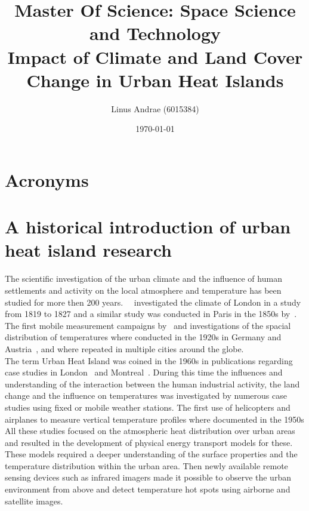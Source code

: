 \documentclass[a4paper, english]{article}
\title{\vspace{1cm}Master Of Science: Space Science and Technology\\ \vspace{1cm} \textbf{\huge Impact of Climate and Land Cover Change in Urban Heat Islands}\\ \vspace{1.2cm} }
\author{Linus Andrae (6015384)}
\date{\today}
\begin{document}
  
  \newpage

  
  \newpage

  \tableofcontents
  \listoffigures
  \listoftables

  \section*{Acronyms}
  \printglossaries%
\newpage

\section{A historical introduction of urban heat island research}
  The scientific investigation of the urban climate and the influence of human settlements and activity on the local atmosphere and temperature has been studied for more then 200 years.%
~\cite{Howard1833}~investigated the climate of London in a study from 1819 to 1827 and a similar study was conducted in Paris in the 1850s by~\cite{renou1862differences}.%
  The first mobile measurement campaigns by~\cite{peppler1929auto} and investigations of the spacial distribution of temperatures where conducted in the 1920s in Germany and Austria~\cite{tollner1932untersuchungen}, and where repeated in multiple cities around the globe.\\%
  The term Urban Heat Island was coined in the 1960s in publications regarding case studies in London~\cite{Chandler1961} and Montreal~\cite{Oke1968}.
  During this time the influences and understanding of the interaction between the human industrial activity, the land change and the influence on temperatures was investigated by numerous case studies using fixed or mobile weather stations.
  The first use of helicopters and airplanes to measure vertical temperature profiles where documented in the 1950s 
  All these studies focused on the atmospheric heat distribution over urban areas and resulted in the development of physical energy transport models for these. 
  These models required a deeper understanding of the surface properties and the temperature distribution within the urban area. 
  Then newly available remote sensing devices such as infrared imagers made it possible to observe the urban environment from above and detect temperature hot spots using airborne and satellite images.  
\end{document}
